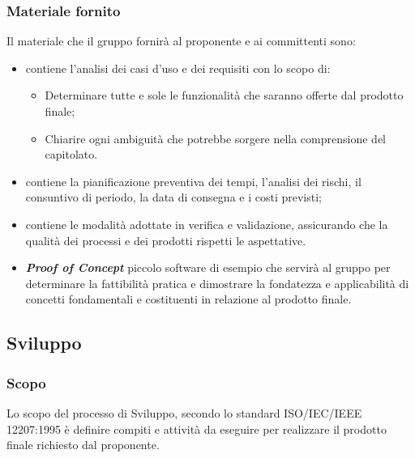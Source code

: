 \subsubsection{Materiale fornito}
Il materiale che il gruppo fornirà al proponente e ai committenti sono:
\begin{itemize}
  \item \textbf{\AdR} contiene l’analisi dei casi d’uso e dei requisiti con lo scopo di: 
	\begin{itemize}
		\item Determinare tutte e sole le funzionalità che saranno offerte dal prodotto finale;
		\item Chiarire ogni ambiguità che potrebbe sorgere nella comprensione del capitolato.
	\end{itemize}  

  \item \textbf{\PdP} contiene la pianificazione preventiva dei tempi, l’analisi dei rischi, il consuntivo di periodo, la data di consegna e i costi previsti;

  \item \textbf{\PdQ} contiene le modalità adottate in verifica e validazione, assicurando che la qualità dei processi e dei prodotti rispetti le aspettative.
  
  \item \textit{\textbf{Proof of Concept}} piccolo software di esempio che servirà al gruppo per determinare la fattibilità pratica e dimostrare la fondatezza e applicabilità di concetti fondamentali e costituenti in relazione al prodotto finale. 

\end{itemize}


\subsection{Sviluppo}
\subsubsection{Scopo}
Lo scopo del processo di Sviluppo, secondo lo standard  ISO/IEC/IEEE 12207:1995 è definire compiti e attività da eseguire per realizzare il prodotto finale richiesto dal proponente.
